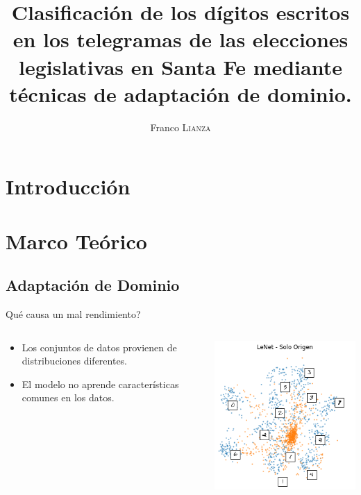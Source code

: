 \documentclass{beamer}
\title{Clasificación de los dígitos escritos en los telegramas de las elecciones legislativas en Santa Fe mediante técnicas de adaptación de dominio.}
\author{Franco \textsc{Lianza}}
\begin{document}
\maketitle

\section{Introducción}

\section{Marco Teórico}

\subsection{Adaptación de Dominio}

\begin{frame}{Qué causa un mal rendimiento?}
      \begin{columns}
            \begin{column}{0.55\textwidth}
                  \begin{itemize}
                        \item Los conjuntos de datos provienen de distribuciones diferentes.
                        \item El modelo no aprende características comunes en los datos.
                  \end{itemize}
            \end{column}
            \begin{column}{0.4\textwidth}
                  \includegraphics[width=\textwidth]{images/marco-teorico/umap-lenet-so.png}
            \end{column}
      \end{columns}
\end{frame}
\end{document}
